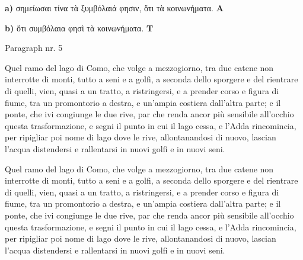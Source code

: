 \documentclass[b5paper]{book}
\begin{document}
\pausenumbering
\begin{pairs}
\begin{Leftside}
\resumenumbering
\numberpstartfalse
    \pstart\noindent \textbf{a)} σημείωσαι τίνα τὰ ξυμβόλαιά φησιν, ὅτι τὰ κοινωνήματα. \textbf{A}\pend
\pausenumbering
\end{Leftside}

\begin{Rightside}
\resumenumbering
\numberpstartfalse
    \pstart\noindent \textbf{b)} ὅτι συμβόλαια φησὶ τὰ κοινωνήματα. \textbf{T}\pend
\pausenumbering
\end{Rightside}
\end{pairs}
\Columns

\numberpstarttrue
\resumenumbering

\pstart%
    Paragraph nr. 5%
\pend


\pausenumbering
\begin{pairs}
\begin{Leftside}
\resumenumbering
\numberpstartfalse
    \pstart
    Quel ramo del lago di Como, che volge a mezzogiorno, tra due catene non interrotte di monti, tutto a seni e a golfi, a seconda dello sporgere e del rientrare di quelli, vien, quasi a un tratto, a ristringersi, e a prender corso e figura di fiume, tra un promontorio a destra, e un'ampia costiera dall'altra parte; e il ponte, che ivi congiunge le due rive, par che renda ancor più sensibile all'occhio questa trasformazione, e segni il punto in cui il lago cessa, e l'Adda rincomincia, per ripigliar poi nome di lago dove le rive, allontanandosi di nuovo, lascian l'acqua distendersi e rallentarsi in nuovi golfi e in nuovi seni.
    \pend
\pausenumbering
\end{Leftside}

\begin{Rightside}
\resumenumbering
\numberpstartfalse
    \pstart
    Quel ramo del lago di Como, che volge a mezzogiorno, tra due catene non interrotte di monti, tutto a seni e a golfi, a seconda dello sporgere e del rientrare di quelli, vien, quasi a un tratto, a ristringersi, e a prender corso e figura di fiume, tra un promontorio a destra, e un'ampia costiera dall'altra parte; e il ponte, che ivi congiunge le due rive, par che renda ancor più sensibile all'occhio questa trasformazione, e segni il punto in cui il lago cessa, e l'Adda rincomincia, per ripigliar poi nome di lago dove le rive, allontanandosi di nuovo, lascian l'acqua distendersi e rallentarsi in nuovi golfi e in nuovi seni.
    \pend
\pausenumbering
\end{Rightside}
\end{pairs}
\Columns
\end{document}
